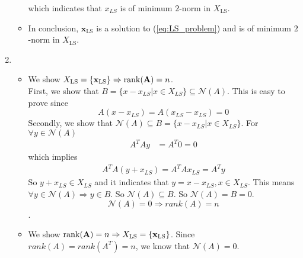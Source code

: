 \documentclass[english,onecolumn]{IEEEtran}
\begin{document}
\begin{enumerate}
\begin{itemize}
		which indicates that $x_{LS}$ is of minimum $2$-norm in $X_{\mathrm{LS}}$.
	\item In conclusion, $\mathbf{x}_{\mathrm{LS}}$ is a solution to (\ref{eq:LS_problem}) and is of minimum $2$-norm in $X_{\mathrm{LS}}$.
	\end{itemize}
	\item 
	\begin{itemize}
		\item We show $X_{\mathrm{LS}}=\{\mathbf{x}_{\mathrm{LS}}\}\Rightarrow\mathrm{rank}({\bf A})=n$.\\
		First, we show that $B = \{x-x_{LS}|x\in X_{LS}\} \subseteq \mathcal{N}(A)$.  This is easy to prove since 
		$$A(x-x_{LS}) = A(x_{LS}-x_{LS}) = 0$$
		Secondly, we show that $\mathcal{N}(A)\subseteq B = \{x-x_{LS}|x\in X_{LS}\}$. For $\forall y \in \mathcal{N}(A)$
		\begin{align*}
			A^TAy &= A^T0 = 0
		\end{align*}
		which implies
		\begin{align*}
			A^TA(y+x_{LS}) = A^TAx_{LS}=A^Ty
		\end{align*}
		So $y+x_{LS} \in X_{LS}$ and it indicates that $y = x-x_{LS}, x\in X_{LS}$. This means $\forall y \in \mathcal{N}(A)\Rightarrow y\in B$. So $\mathcal{N}(A)\subseteq B $. 
		So $\mathcal{N}(A) = B = {0}$. 
		$$\mathcal{N}(A) = 0 \Rightarrow rank(A) = n$$.
		\item We show $\mathrm{rank}({\bf A})=n\Rightarrow X_{\mathrm{LS}}=\{\mathbf{x}_{\mathrm{LS}}\}$.
		Since $rank(A) = rank(A^T)=n$, we  know that $\mathcal{N}(A) = {0}$.
	\end{itemize}
\end{enumerate}
\end{document}
